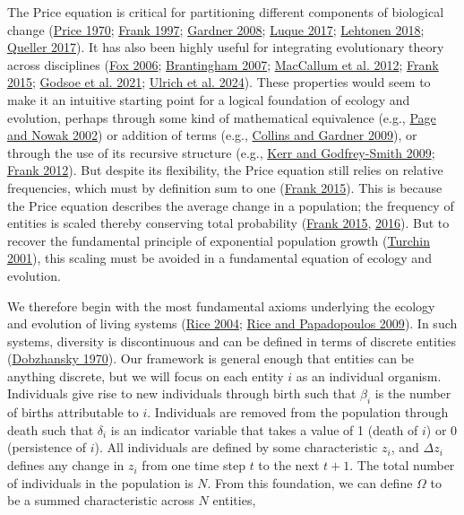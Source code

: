 \documentclass[
]{article}
\begin{document}
The Price equation is critical for partitioning different components of
biological change (\protect\hyperlink{ref-Price1970}{Price 1970};
\protect\hyperlink{ref-Frank1997}{Frank 1997};
\protect\hyperlink{ref-Gardner2008}{Gardner 2008};
\protect\hyperlink{ref-Luque2016}{Luque 2017};
\protect\hyperlink{ref-Lehtonen2018}{Lehtonen 2018};
\protect\hyperlink{ref-Queller2017}{Queller 2017}). It has also been
highly useful for integrating evolutionary theory across disciplines
(\protect\hyperlink{ref-Fox2006}{Fox 2006};
\protect\hyperlink{ref-Brantingham2007}{Brantingham 2007};
\protect\hyperlink{ref-MacCallum2012}{MacCallum et al. 2012};
\protect\hyperlink{ref-Frank2015}{Frank 2015};
\protect\hyperlink{ref-Godsoe2021}{Godsoe et al. 2021};
\protect\hyperlink{ref-Ulrich2024}{Ulrich et al. 2024}). These
properties would seem to make it an intuitive starting point for a
logical foundation of ecology and evolution, perhaps through some kind
of mathematical equivalence (e.g., \protect\hyperlink{ref-Page2002}{Page
and Nowak 2002}) or addition of terms (e.g.,
\protect\hyperlink{ref-Collins2009}{Collins and Gardner 2009}), or
through the use of its recursive structure (e.g.,
\protect\hyperlink{ref-Kerr2009}{Kerr and Godfrey-Smith 2009};
\protect\hyperlink{ref-Frank2012}{Frank 2012}). But despite its
flexibility, the Price equation still relies on relative frequencies,
which must by definition sum to one
(\protect\hyperlink{ref-Frank2015}{Frank 2015}). This is because the
Price equation describes the average change in a population; the
frequency of entities is scaled thereby conserving total probability
(\protect\hyperlink{ref-Frank2015}{Frank 2015},
\protect\hyperlink{ref-Frank2016}{2016}). But to recover the fundamental
principle of exponential population growth
(\protect\hyperlink{ref-Turchin2001}{Turchin 2001}), this scaling must
be avoided in a fundamental equation of ecology and evolution.

We therefore begin with the most fundamental axioms underlying the
ecology and evolution of living systems
(\protect\hyperlink{ref-Rice2004}{Rice 2004};
\protect\hyperlink{ref-Rice2009}{Rice and Papadopoulos 2009}). In such
systems, diversity is discontinuous and can be defined in terms of
discrete entities (\protect\hyperlink{ref-Dobzhansky1970}{Dobzhansky
1970}). Our framework is general enough that entities can be anything
discrete, but we will focus on each entity \(i\) as an individual
organism. Individuals give rise to new individuals through birth such
that \(\beta_{i}\) is the number of births attributable to \(i\).
Individuals are removed from the population through death such that
\(\delta_{i}\) is an indicator variable that takes a value of 1 (death
of \(i\)) or 0 (persistence of \(i\)). All individuals are defined by
some characteristic \(z_{i}\), and \(\Delta z_{i}\) defines any change
in \(z_{i}\) from one time step \(t\) to the next \(t + 1\). The total
number of individuals in the population is \(N\). From this foundation,
we can define \(\Omega\) to be a summed characteristic across \(N\)
entities,
\end{document}
